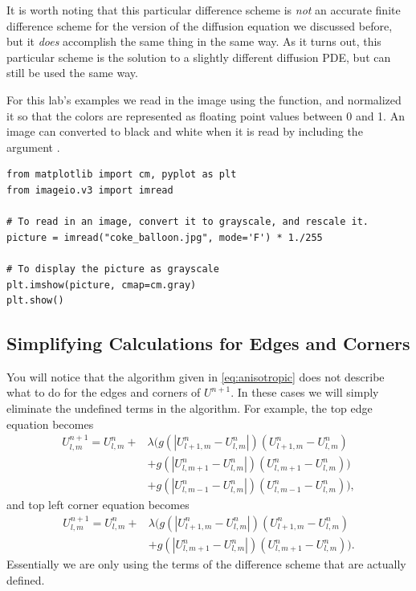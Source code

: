 It is worth noting that this particular difference scheme is \textit{not} an accurate finite difference scheme for the version of the diffusion equation we discussed before, but it \textit{does} accomplish the same thing in the same way.
As it turns out, this particular scheme is the solution to a slightly different diffusion PDE, but can still be used the same way.

For this lab's examples we read in the image using the  function, and normalized it so that the colors are represented as floating point values between 0 and 1.
An image can converted to black and white when it is read by including the argument .

\begin{lstlisting}
from matplotlib import cm, pyplot as plt
from imageio.v3 import imread

# To read in an image, convert it to grayscale, and rescale it.
picture = imread("coke_balloon.jpg", mode='F') * 1./255

# To display the picture as grayscale
plt.imshow(picture, cmap=cm.gray)
plt.show()
\end{lstlisting}

\subsection*{Simplifying Calculations for Edges and Corners}\label{sec:simp}

You will notice that the algorithm given in \eqref{eq:anisotropic} does not describe what to do for the edges and corners of $U^{n+1}$.
In these cases we will simply eliminate the undefined terms in the algorithm.
For example, the top edge equation becomes
\begin{align*}
U_{l,m}^{n+1} = U_{l,m}^n + & \lambda (g(|U_{l+1,m}^n - U_{l,m}^n|)(U_{l+1,m}^n - U_{l,m}^n) \\
                    & + g(|U_{l,m+1}^n - U_{l,m}^n|)(U_{l,m+1}^n - U_{l,m}^n)) \\
					& + g(|U_{l,m-1}^n - U_{l,m}^n|)(U_{l,m-1}^n - U_{l,m}^n)),
\end{align*}
and top left corner equation becomes
\begin{align*}
U_{l,m}^{n+1} = U_{l,m}^n + & \lambda (g(|U_{l+1,m}^n - U_{l,m}^n|)(U_{l+1,m}^n - U_{l,m}^n) \\
					& + g(|U_{l,m+1}^n - U_{l,m}^n|)(U_{l,m+1}^n - U_{l,m}^n)).
\end{align*}
Essentially we are only using the terms of the difference scheme that are actually defined.

